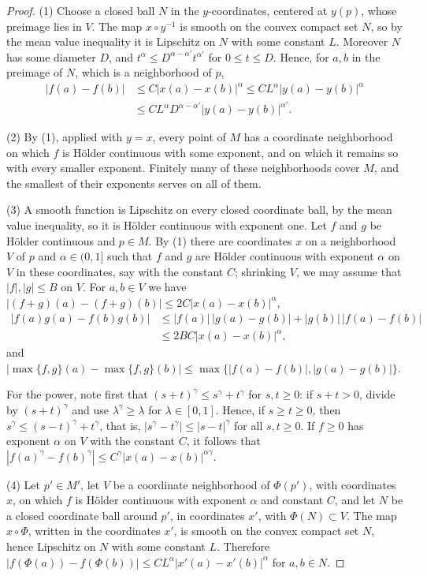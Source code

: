 \begin{proof}
(1) Choose a closed ball $N$ in the $y$-coordinates, centered at $y(p)$, whose preimage lies in $V$. The map $x\circ y^{-1}$ is smooth on the convex compact set $N$, so by the mean value inequality it is Lipschitz on $N$ with some constant $L$. Moreover $N$ has some diameter $D$, and $t^\alpha\leq D^{\alpha-\alpha'}t^{\alpha'}$ for $0\leq t\leq D$. Hence, for $a,b$ in the preimage of $N$, which is a neighborhood of $p$,
\begin{align*}
 |f(a)-f(b)|&\leq C|x(a)-x(b)|^\alpha\leq CL^\alpha|y(a)-y(b)|^\alpha\\
 &\leq CL^\alpha D^{\alpha-\alpha'}|y(a)-y(b)|^{\alpha'}.
\end{align*}

(2) By (1), applied with $y=x$, every point of $M$ has a coordinate neighborhood on which $f$ is H\"older continuous with some exponent, and on which it remains so with every smaller exponent. Finitely many of these neighborhoods cover $M$, and the smallest of their exponents serves on all of them.

(3) A smooth function is Lipschitz on every closed coordinate ball, by the mean value inequality, so it is H\"older continuous with exponent one. Let $f$ and $g$ be H\"older continuous and $p\in M$. By (1) there are coordinates $x$ on a neighborhood $V$ of $p$ and $\alpha\in(0,1]$ such that $f$ and $g$ are H\"older continuous with exponent $\alpha$ on $V$ in these coordinates, say with the constant $C$; shrinking $V$, we may assume that $|f|,|g|\leq B$ on $V$. For $a,b\in V$ we have $|(f+g)(a)-(f+g)(b)|\leq2C|x(a)-x(b)|^\alpha$,
\begin{align*}
 |f(a)g(a)-f(b)g(b)|&\leq|f(a)|\,|g(a)-g(b)|+|g(b)|\,|f(a)-f(b)|\\
 &\leq2BC|x(a)-x(b)|^\alpha,
\end{align*}
and $|\max\{f,g\}(a)-\max\{f,g\}(b)|\leq\max\{|f(a)-f(b)|,|g(a)-g(b)|\}$.

For the power, note first that $(s+t)^\gamma\leq s^\gamma+t^\gamma$ for $s,t\geq0$: if $s+t>0$, divide by $(s+t)^\gamma$ and use $\lambda^\gamma\geq\lambda$ for $\lambda\in[0,1]$. Hence, if $s\geq t\geq0$, then $s^\gamma\leq(s-t)^\gamma+t^\gamma$, that is, $|s^\gamma-t^\gamma|\leq|s-t|^\gamma$ for all $s,t\geq0$. If $f\geq0$ has exponent $\alpha$ on $V$ with the constant $C$, it follows that $|f(a)^\gamma-f(b)^\gamma|\leq C^\gamma|x(a)-x(b)|^{\alpha\gamma}$.

(4) Let $p'\in M'$, let $V$ be a coordinate neighborhood of $\Phi(p')$, with coordinates $x$, on which $f$ is H\"older continuous with exponent $\alpha$ and constant $C$, and let $N$ be a closed coordinate ball around $p'$, in coordinates $x'$, with $\Phi(N)\subset V$. The map $x\circ\Phi$, written in the coordinates $x'$, is smooth on the convex compact set $N$, hence Lipschitz on $N$ with some constant $L$. Therefore $|f(\Phi(a))-f(\Phi(b))|\leq CL^\alpha|x'(a)-x'(b)|^\alpha$ for $a,b\in N$.
\end{proof}

